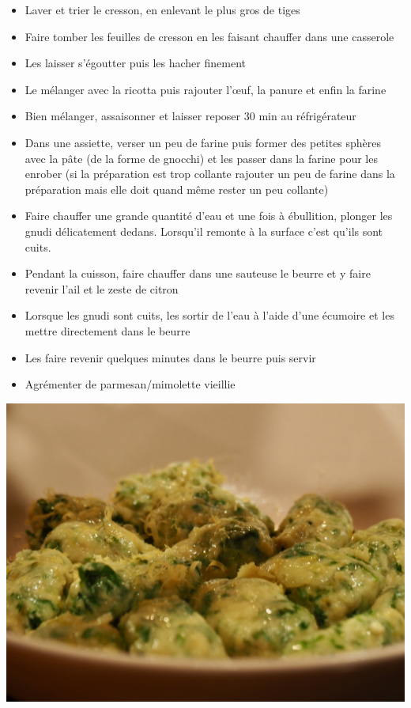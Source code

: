 \documentclass[]{book}
\providecommand{\tightlist}{%
  \setlength{\itemsep}{0pt}\setlength{\parskip}{0pt}}
\begin{document}
\begin{itemize}
\tightlist
\item
  Laver et trier le cresson, en enlevant le plus gros de tiges
\item
  Faire tomber les feuilles de cresson en les faisant chauffer dans une casserole
\item
  Les laisser s'égoutter puis les hacher finement
\item
  Le mélanger avec la ricotta puis rajouter l'œuf, la panure et enfin la farine
\item
  Bien mélanger, assaisonner et laisser reposer 30 min au réfrigérateur
\item
  Dans une assiette, verser un peu de farine puis former des petites sphères avec la pâte (de la forme de gnocchi) et les passer dans la farine pour les enrober (si la préparation est trop collante rajouter un peu de farine dans la préparation mais elle doit quand même rester un peu collante)
\item
  Faire chauffer une grande quantité d'eau et une fois à ébullition, plonger les gnudi délicatement dedans. Lorsqu'il remonte à la surface c'est qu'ils sont cuits.
\item
  Pendant la cuisson, faire chauffer dans une sauteuse le beurre et y faire revenir l'ail et le zeste de citron
\item
  Lorsque les gnudi sont cuits, les sortir de l'eau à l'aide d'une écumoire et les mettre directement dans le beurre
\item
  Les faire revenir quelques minutes dans le beurre puis servir
\item
  Agrémenter de parmesan/mimolette vieillie
\end{itemize}

\begin{center}\includegraphics[width=0.9\linewidth]{photos/gnudi} \end{center}
\end{document}
